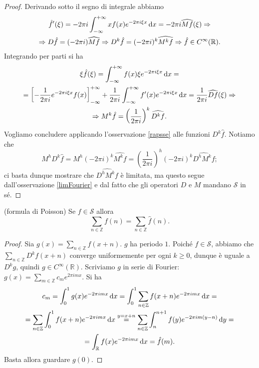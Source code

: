 \begin{proof}
  Derivando sotto il segno di integrale abbiamo
  \begin{gather*}
    \hat{f}'(\xi)=-2\pi i \int_{-\infty}^{+\infty} xf(x)e^{-2\pi i\xi x}\mathop{}\!\mathrm{d} x=-2\pi i \widehat{Mf}(\xi) \Rightarrow \\
    \Rightarrow D\hat{f}=(-2\pi i)\widehat{Mf} \Rightarrow D^k\hat{f}=(-2\pi i)^k\widehat{M^kf} \Rightarrow \hat{f} \in C^{\infty}(\mathbb{R}).
  \end{gather*}
  Integrando per parti si ha
  \begin{gather*}
    \xi\hat{f}(\xi)=\int_{-\infty}^{+\infty} f(x)\xi e^{-2\pi i\xi x}\mathop{}\!\mathrm{d} x= \\
    =\left[-\frac{1}{2\pi i}e^{-2\pi i\xi x}f(x)\right]_{-\infty}^{+\infty}+\frac{1}{2\pi i}\int_{-\infty}^{+\infty} f'(x)e^{-2\pi i\xi x}\mathop{}\!\mathrm{d} x=\frac{1}{2\pi i}\widehat{Df}(\xi) \Rightarrow \\
    \Rightarrow M^k\hat{f}=\left(\frac{1}{2\pi i}\right)^k\widehat{D^kf}.
  \end{gather*}
  Vogliamo concludere applicando l'osservazione \ref{rapsse} alle funzioni $D^k\hat{f}$. Notiamo che
  $$M^hD^k\hat{f}=M^h(-2\pi i)^k\widehat{M^kf}=\left(\frac{1}{2\pi i}\right)^h(-2\pi i)^k\widehat{D^hM^kf};$$
  ci basta dunque mostrare che $\widehat{D^hM^kf}$ è limitata, ma questo segue dall'osservazione \ref{limFourier} e dal fatto che gli operatori $D$ e $M$ mandano $\mathcal{S}$ in sé.
\end{proof}

\begin{lm}
  (formula di Poisson) Se $f \in \mathcal{S}$ allora
  $$\sum_{n \in \mathbb{Z}} f(n)=\sum_{n \in \mathbb{Z}} \hat{f}(n).$$
\end{lm}

\begin{proof}
  Sia $\displaystyle g(x)=\sum_{n \in \mathbb{Z}} f(x+n)$. $g$ ha periodo $1$. Poiché $f \in \mathcal{S}$, abbiamo che $\displaystyle \sum_{n \in \mathbb{Z}} D^kf(x+n)$ converge uniformemente per ogni $k \ge 0$, dunque è uguale a $D^kg$, quindi $g \in C^{\infty}(\mathbb{R})$. Scriviamo $g$ in serie di Fourier: $\displaystyle g(x)=\sum_{m \in \mathbb{Z}} c_me^{2\pi imx}$. Si ha
  \begin{gather*}
    c_m=\int_0^1 g(x)e^{-2\pi imx}\mathop{}\!\mathrm{d} x=\int_0^1 \sum_{n \in \mathbb{Z}} f(x+n)e^{-2\pi imx}\mathop{}\!\mathrm{d} x=\\
    =\sum_{n \in \mathbb{Z}}\int_0^1 f(x+n)e^{-2\pi imx}\mathop{}\!\mathrm{d} x \overset{y=x+n}{=} \sum_{n \in \mathbb{Z}} \int_n^{n+1} f(y)e^{-2\pi im(y-n)}\mathop{}\!\mathrm{d} y=\\
    =\int_{\mathbb{R}} f(x)e^{-2\pi imx}\mathop{}\!\mathrm{d} x=\hat{f}(m).
  \end{gather*}
  Basta allora guardare $g(0)$.
\end{proof}

